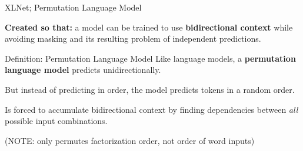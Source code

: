 \begin{frame}{XLNet; Permutation Language Model}
    
    
    \textbf{Created so that: } a model can be trained to use \textbf{bidirectional context} while avoiding masking and its resulting problem of independent predictions.

    \vspace{20pt}
    
    \begin{definitionBlock}{Definition: Permutation Language Model}
    Like language models, a \textbf{permutation language model} predicts unidirectionally. 
    
    But instead of predicting in order, the model predicts tokens in a random order. 
    
    Is forced to accumulate bidirectional context by finding dependencies between \emph{all} possible input combinations. 
    
    (NOTE: only permutes factorization order, not order of word inputs)
    \end{definitionBlock}
    
\end{frame}


